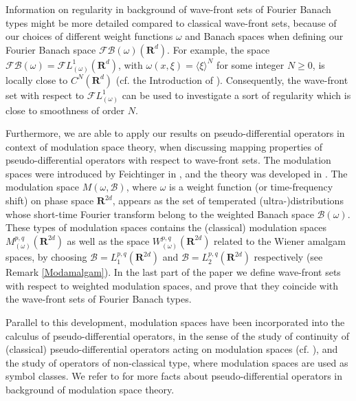 \documentclass[12pt,a4paper,reqno]{amsart}
\numberwithin{equation}{section}
\numberwithin{thm}{section}
\theoremstyle{definition}
\theoremstyle{remark}
\begin{document}
\medspace

Information on regularity in background of wave-front sets of
Fourier Banach types might be more detailed compared to classical
wave-front sets, because of our choices of different weight functions
$\omega$ and Banach spaces when defining our Fourier Banach space
${\mathscr F\! \mathscr B}(\omega )({\mathbf R^{d}})$. For example, the space ${\mathscr F\! \mathscr B}(\omega)=\mathscr
FL^1_{(\omega )}({\mathbf R^{d}})$, with $\omega (x,\xi )={\langle \xi\rangle} ^N$ for some
integer $N\ge 0$, is locally close to $C^N({\mathbf R^{d}})$ (cf. the Introduction of
\cite{PTT1}). Consequently, the wave-front set with respect to $\mathscr FL^1_{(\omega )}$ can be
used to investigate a sort of regularity which is close to smoothness
of order $N$.

\medspace

Furthermore, we are able to apply our results on pseudo-differential
operators in context of modulation space theory, when discussing
mapping properties of pseudo-differential operators with respect to
wave-front sets.  
The modulation spaces were introduced by Feichtinger in \cite{F1}, and
the theory was developed in
\cite{Feichtinger3, Feichtinger4, Feichtinger5, Grochenig0a}. The
modulation space $M(\omega, \mathscr B )$, where $\omega$ is
a weight function (or time-frequency shift) on phase space ${\mathbf R^{{2d}}}$,
appears as the set of temperated (ultra-)distributions
whose short-time Fourier transform belong to the weighted Banach space
$\mathscr B(\omega )$.
These types of modulation spaces contains the (classical) modulation
spaces $M^{p,q}_{(\omega)}({\mathbf R^{{2d}}})$ as well as the space
$W^{p,q}_{(\omega)}({\mathbf R^{{2d}}})$ related to the Wiener amalgam spaces,
by choosing $\mathscr B =L^{p,q}_1({\mathbf R^{{2d}}})$ and $\mathscr B
=L^{p,q}_2({\mathbf R^{{2d}}})$ respectively (see Remark \ref{Modamalgam}).
In the last part of the paper we define wave-front sets with respect to
weighted modulation spaces, and prove that they coincide with the
wave-front sets of Fourier Banach types.

\par

Parallel to this development, modulation spaces have been
incorporated into the calculus of pseudo-differential operators, in
the sense of the study of continuity of (classical)
pseudo-differential operators acting on modulation spaces (cf.
\cite{Tachizawa1,Czaja,Pilipovic2,Pilipovic3,Teofanov1,Teofanov2}),
and the study of operators of non-classical type, where modulation
spaces are used as symbol classes. We refer to \cite{Gro-book, Grochenig2, Grochenig0,
Grochenig1b, Grochenig1c, Herau1, HTW, Pilipovic2,
Sjostrand1, Sjostrand2, Toft2, Toft35, To8, Toft4} for more facts about pseudo-differential operators in background of modulation space theory.
\end{document}
